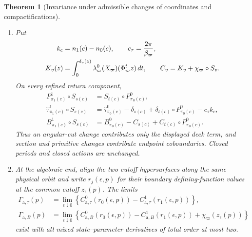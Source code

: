 \documentclass[11pt]{amsart}
\numberwithin{equation}{section}
\newtheorem{theorem}{Theorem}[section]
\theoremstyle{definition}
\theoremstyle{remark}
\begin{document}
\begin{theorem}[Invariance under admissible changes of coordinates and compactifications]
\begin{enumerate}
\item Put
\begin{align}
 k_c&=n_1(c)-n_0(c),\qquad
 c_\tau=\frac{2\pi}{\beta_\varpi},\notag\\
 K_v(z)&=\int_0^{\delta_v(z)}
       \lambda_\varpi^0(X_\varpi)(\Phi_\varpi^tz)\,dt,\qquad
 C_v=K_v+\chi_\varpi\circ S_v.
 \label{eq:change-marking-transfer-functions}
\end{align}
On every refined return component,
\begin{align}
 P^1_{\pi_1(c)}\circ S_{s(c)}
 &=S_{t(c)}\circ P^0_{\pi_0(c)},
 \label{eq:refined-section-conjugacy}\\
 \widehat\tau^1_{\pi_1(c)}\circ S_{s(c)}
 &=\widehat\tau^0_{\pi_0(c)}
   -\delta_{s(c)}+\delta_{t(c)}\circ P^0_{\pi_0(c)}
   -c_\tau k_c,
 \label{eq:refined-roof-transfer}\\
 B^1_{\pi_1(c)}\circ S_{s(c)}
 &=B^0_{\pi_0(c)}
   -C_{s(c)}+C_{t(c)}\circ P^0_{\pi_0(c)}.
 \label{eq:refined-action-transfer}
\end{align}
Thus an angular-cut change contributes only the displayed deck term, and
section and primitive changes contribute endpoint coboundaries.  Closed
periods and closed actions are unchanged.

\item At the algebraic end, align the two cutoff hypersurfaces along the
same physical orbit and write $r_j(\epsilon,p)$ for their boundary
defining-function values at the common cutoff $z_\epsilon(p)$.  The limits
\begin{align}
 \Gamma_{\mathrm a,\tau}(p)
 &=\lim_{\epsilon\downarrow0}
   \left\{
    C^0_{\mathrm a,\tau}(r_0(\epsilon,p))
    -C^1_{\mathrm a,\tau}(r_1(\epsilon,p))
   \right\},
 \label{eq:end-time-finite-part}\\
 \Gamma_{\mathrm a,B}(p)
 &=\lim_{\epsilon\downarrow0}
   \left\{
    C^0_{\mathrm a,B}(r_0(\epsilon,p))
    -C^1_{\mathrm a,B}(r_1(\epsilon,p))
    +\chi_\varpi(z_\epsilon(p))
   \right\}
 \label{eq:end-action-finite-part}
\end{align}
exist with all mixed state--parameter derivatives of total order at most
two.


\end{enumerate}
\end{theorem}
\end{document}
